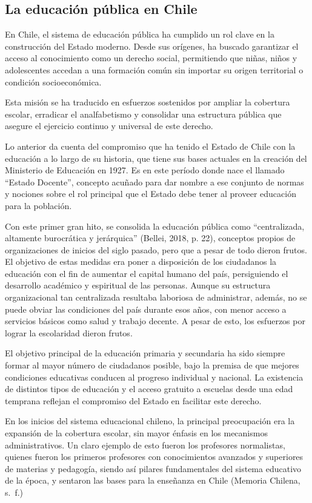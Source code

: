 \documentclass[
  12pt,
  letterpaper,
]{article}
\begin{document}
\subsection{La educación pública en Chile}\label{la-educaciuxf3n-puxfablica-en-chile}

En Chile, el sistema de educación pública ha cumplido un rol clave en la construcción del Estado moderno.
Desde sus orígenes, ha buscado garantizar el acceso al conocimiento como un derecho social, permitiendo que niñas, niños y adolescentes accedan a una formación común sin importar su origen territorial o condición socioeconómica.

Esta misión se ha traducido en esfuerzos sostenidos por ampliar la cobertura escolar, erradicar el analfabetismo y consolidar una estructura pública que asegure el ejercicio continuo y universal de este derecho.

Lo anterior da cuenta del compromiso que ha tenido el Estado de Chile con la educación a lo largo de su historia, que tiene sus bases actuales en la creación del Ministerio de Educación en 1927.
Es en este período donde nace el llamado ``Estado Docente'', concepto acuñado para dar nombre a ese conjunto de normas y nociones sobre el rol principal que el Estado debe tener al proveer educación para la población.

Con este primer gran hito, se consolida la educación pública como ``centralizada, altamente burocrática y jerárquica'' (Bellei, 2018, p. 22), conceptos propios de organizaciones de inicios del siglo pasado, pero que a pesar de todo dieron frutos.
El objetivo de estas medidas era poner a disposición de los ciudadanos la educación con el fin de aumentar el capital humano del país, persiguiendo el desarrollo académico y espiritual de las personas.
Aunque su estructura organizacional tan centralizada resultaba laboriosa de administrar, además, no se puede obviar las condiciones del país durante esos años, con menor acceso a servicios básicos como salud y trabajo decente.
A pesar de esto, los esfuerzos por lograr la escolaridad dieron frutos.

El objetivo principal de la educación primaria y secundaria ha sido siempre formar al mayor número de ciudadanos posible, bajo la premisa de que mejores condiciones educativas conducen al progreso individual y nacional.
La existencia de distintos tipos de educación y el acceso gratuito a escuelas desde una edad temprana reflejan el compromiso del Estado en facilitar este derecho.

En los inicios del sistema educacional chileno, la principal preocupación era la expansión de la cobertura escolar, sin mayor énfasis en los mecanismos administrativos.
Un claro ejemplo de esto fueron los profesores normalistas, quienes fueron los primeros profesores con conocimientos avanzados y superiores de materias y pedagogía, siendo así pilares fundamentales del sistema educativo de la época, y sentaron las bases para la enseñanza en Chile (Memoria Chilena, s.~f.)
\end{document}
